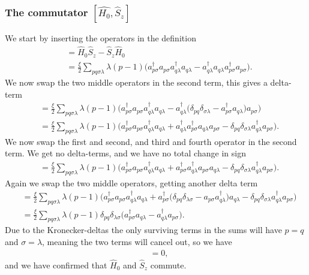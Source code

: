 \documentclass[a4paper, 11pt, notitlepage, english]{article}
\newcommand{\op}[1]{\hat{#1}}
\begin{document}
\subsubsection*{The commutator $[\op{H_0}, \op{S}_z]$}
We start by inserting the operators in the definition
\begin{align*}
[\op{H}_0, \op{S}_z] &= \op{H}_0\op{S}_z - \op{S}_z\op{H}_0 \\
&= \frac{\xi}{2}\sum_{pq \sigma\lambda} \lambda(p-1)\bigg(a_{p\sigma}^\dagger a_{p\sigma}  a_{q\lambda}^\dagger a_{q\lambda}
-   a_{q\lambda}^\dagger a_{q\lambda}  a_{p\sigma}^\dagger a_{p\sigma}\bigg).
\end{align*}
We now swap the two middle operators in the second term, this gives a delta-term
\begin{align*}
[\op{H}_0, \op{S}_z] &= \frac{\xi}{2}\sum_{pq \sigma\lambda} \lambda(p-1)\bigg(a_{p\sigma}^\dagger a_{p\sigma}  a_{q\lambda}^\dagger a_{q\lambda} 
-   a_{q\lambda}^\dagger \big(\delta_{pq}\delta_{\sigma\lambda} - a_{p\sigma}^\dagger a_{q\lambda} \big) a_{p\sigma}\bigg) \\
&= \frac{\xi}{2}\sum_{pq \sigma\lambda} \lambda(p-1)\bigg(a_{p\sigma}^\dagger a_{p\sigma}  a_{q\lambda}^\dagger a_{q\lambda}
+   a_{q\lambda}^\dagger a_{p\sigma}^\dagger a_{q\lambda} a_{p\sigma} - \delta_{pq}\delta_{\sigma\lambda}a_{q\lambda}^\dagger a_{p\sigma}
\bigg).
\end{align*}
We now swap the first and second, and third and fourth operator in the second term. We get no delta-terms, and we have no total change in sign
\begin{align*}
[\op{H}_0, \op{S}_z]  &= \frac{\xi}{2}\sum_{pq \sigma\lambda} \lambda(p-1)\bigg(a_{p\sigma}^\dagger a_{p\sigma}  a_{q\lambda}^\dagger a_{q\lambda}
+   a_{p\sigma}^\dagger  a_{q\lambda}^\dagger  a_{p\sigma} a_{q\lambda} - \delta_{pq}\delta_{\sigma\lambda}a_{q\lambda}^\dagger a_{p\sigma}
\bigg).
\end{align*}
Again we swap the two middle operators, getting another delta term
\begin{align*}
 [\op{H}_0, \op{S}_z]  &= \frac{\xi}{2}\sum_{pq \sigma\lambda} \lambda(p-1)\bigg(a_{p\sigma}^\dagger a_{p\sigma}  a_{q\lambda}^\dagger a_{q\lambda}
+  a_{p\sigma}^\dagger  \big(\delta_{pq}\delta_{\lambda\sigma} - a_{p\sigma} a_{q\lambda}^\dagger  \big) a_{q\lambda} - \delta_{pq}\delta_{\sigma\lambda}a_{q\lambda}^\dagger a_{p\sigma}
\bigg) \\
&= \frac{\xi}{2}\sum_{pq \sigma\lambda} \lambda(p-1) \delta_{pq}\delta_{\lambda\sigma}\big(a_{p\sigma}^\dagger a_{q\lambda} - a_{q\lambda}^\dagger a_{p\sigma}
\big).
\end{align*}
Due to the Kronecker-deltas the only surviving terms in the sums will have $p=q$ and $\sigma=\lambda$, meaning the two terms will cancel out, so we have
\begin{align*}
 [\op{H}_0, \op{S}_z] &= 0,
\end{align*}
and we have confirmed that $\op{H}_0$ and $\op{S}_z$ commute.
\end{document}
